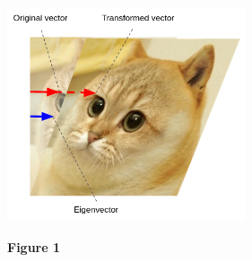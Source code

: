\documentclass{article}
\begin{document}
\begin{center}
	\includegraphics[width=7cm]{eigen-cate-sheered.png}	
\end{center}

\begin{center}
	\textbf{Figure 1}
\end{center}
\end{document}
